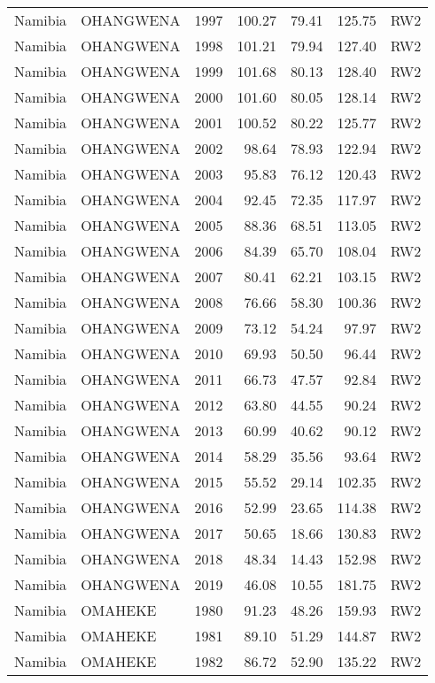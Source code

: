 \begin{longtable}{lllrrrl}
  Namibia & OHANGWENA & 1997 & 100.27 & 79.41 & 125.75 & RW2 \\ 
  Namibia & OHANGWENA & 1998 & 101.21 & 79.94 & 127.40 & RW2 \\ 
  Namibia & OHANGWENA & 1999 & 101.68 & 80.13 & 128.40 & RW2 \\ 
  Namibia & OHANGWENA & 2000 & 101.60 & 80.05 & 128.14 & RW2 \\ 
  Namibia & OHANGWENA & 2001 & 100.52 & 80.22 & 125.77 & RW2 \\ 
  Namibia & OHANGWENA & 2002 & 98.64 & 78.93 & 122.94 & RW2 \\ 
  Namibia & OHANGWENA & 2003 & 95.83 & 76.12 & 120.43 & RW2 \\ 
  Namibia & OHANGWENA & 2004 & 92.45 & 72.35 & 117.97 & RW2 \\ 
  Namibia & OHANGWENA & 2005 & 88.36 & 68.51 & 113.05 & RW2 \\ 
  Namibia & OHANGWENA & 2006 & 84.39 & 65.70 & 108.04 & RW2 \\ 
  Namibia & OHANGWENA & 2007 & 80.41 & 62.21 & 103.15 & RW2 \\ 
  Namibia & OHANGWENA & 2008 & 76.66 & 58.30 & 100.36 & RW2 \\ 
  Namibia & OHANGWENA & 2009 & 73.12 & 54.24 & 97.97 & RW2 \\ 
  Namibia & OHANGWENA & 2010 & 69.93 & 50.50 & 96.44 & RW2 \\ 
  Namibia & OHANGWENA & 2011 & 66.73 & 47.57 & 92.84 & RW2 \\ 
  Namibia & OHANGWENA & 2012 & 63.80 & 44.55 & 90.24 & RW2 \\ 
  Namibia & OHANGWENA & 2013 & 60.99 & 40.62 & 90.12 & RW2 \\ 
  Namibia & OHANGWENA & 2014 & 58.29 & 35.56 & 93.64 & RW2 \\ 
  Namibia & OHANGWENA & 2015 & 55.52 & 29.14 & 102.35 & RW2 \\ 
  Namibia & OHANGWENA & 2016 & 52.99 & 23.65 & 114.38 & RW2 \\ 
  Namibia & OHANGWENA & 2017 & 50.65 & 18.66 & 130.83 & RW2 \\ 
  Namibia & OHANGWENA & 2018 & 48.34 & 14.43 & 152.98 & RW2 \\ 
  Namibia & OHANGWENA & 2019 & 46.08 & 10.55 & 181.75 & RW2 \\ 
  Namibia & OMAHEKE & 1980 & 91.23 & 48.26 & 159.93 & RW2 \\ 
  Namibia & OMAHEKE & 1981 & 89.10 & 51.29 & 144.87 & RW2 \\ 
  Namibia & OMAHEKE & 1982 & 86.72 & 52.90 & 135.22 & RW2 \\ 

\end{longtable}

